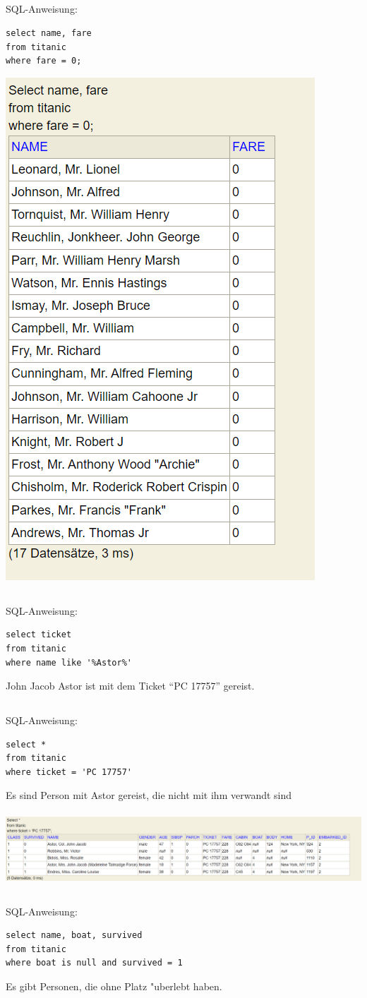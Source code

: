 \documentclass[a4paper, 11pt, titlepage]{article}
\begin{document}
\subsection{}
SQL-Anweisung:
\begin{lstlisting}
select name, fare
from titanic
where fare = 0;
\end{lstlisting}
\includegraphics [width = 4 cm] {e}
\subsection{}
SQL-Anweisung:
\begin{lstlisting}
select ticket
from titanic
where name like '%Astor%'
\end{lstlisting}
John Jacob Astor ist mit dem Ticket "`PC 17757"' gereist.
\subsection{}
SQL-Anweisung:
\begin{lstlisting}
select *
from titanic
where ticket = 'PC 17757'
\end{lstlisting}
Es sind Person mit Astor gereist, die nicht mit ihm verwandt sind\\
\\
\includegraphics [width = 15 cm] {g}
\subsection{}
SQL-Anweisung:
\begin{lstlisting}
select name, boat, survived
from titanic
where boat is null and survived = 1
\end{lstlisting}
Es gibt Personen, die ohne Platz "uberlebt haben.
\end{document}
